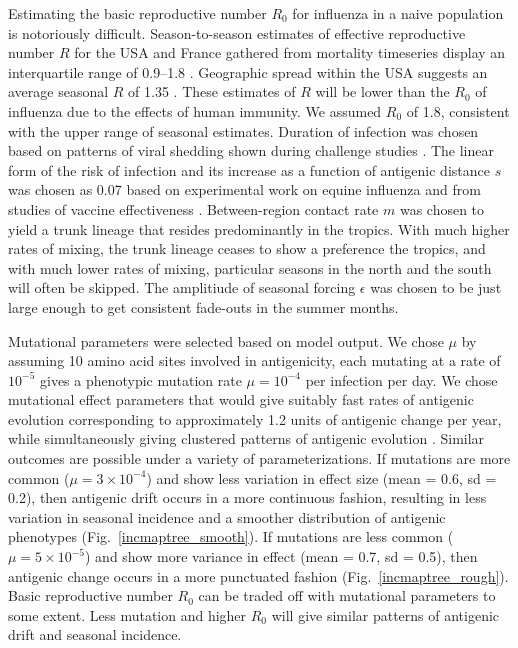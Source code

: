 \documentclass[11pt,oneside,letterpaper]{article}
\begin{document}
Estimating the basic reproductive number $R_0$ for influenza in a naive population is notoriously difficult.  Season-to-season estimates of effective reproductive number $R$ for the USA and France gathered from mortality timeseries display an interquartile range of 0.9--1.8 \cite{Chowell08}.  Geographic spread within the USA suggests an average seasonal $R$ of 1.35 \cite{Viboud06}.  These estimates of $R$ will be lower than the $R_0$ of influenza due to the effects of human immunity.  We assumed $R_0$ of 1.8, consistent with the upper range of seasonal estimates.  Duration of infection was chosen based on patterns of viral shedding shown during challenge studies \cite{Carrat08}.  The linear form of the risk of infection and its increase as a function of antigenic distance $s$ was chosen as 0.07 based on experimental work on equine influenza \cite{Park09} and from studies of vaccine effectiveness \cite{Gupta06}.  Between-region contact rate $m$ was chosen to yield a trunk lineage that resides predominantly in the tropics.  With much higher rates of mixing, the trunk lineage ceases to show a preference the tropics, and with much lower rates of mixing, particular seasons in the north and the south will often be skipped.  The amplitiude of seasonal forcing $\epsilon$ was chosen to be just large enough to get consistent fade-outs in the summer months.

Mutational parameters were selected based on model output.  We chose $\mu$ by assuming 10 amino acid sites involved in antigenicity, each mutating at a rate of $10^{-5}$ \cite{Rambaut08} gives a phenotypic mutation rate $\mu = 10^{-4}$ per infection per day.  We chose mutational effect parameters that would give suitably fast rates of antigenic evolution corresponding to approximately 1.2 units of antigenic change per year, while simultaneously giving clustered patterns of antigenic evolution  \cite{Smith04}.  Similar outcomes are possible under a variety of parameterizations.  If mutations are more common ($\mu = 3 \times 10^{-4}$) and show less variation in effect size (mean = 0.6, sd = 0.2), then antigenic drift occurs in a more continuous fashion, resulting in less variation in seasonal incidence and a smoother distribution of antigenic phenotypes (Fig.~\ref{incmaptree_smooth}).  If mutations are less common ($\mu = 5 \times 10^{-5}$) and show more variance in effect (mean = 0.7, sd = 0.5), then antigenic change occurs in a more punctuated fashion (Fig.~\ref{incmaptree_rough}).  Basic reproductive number $R_0$ can be traded off with mutational parameters to some extent.  Less mutation and higher $R_0$ will give similar patterns of antigenic drift and seasonal incidence.
\end{document}
